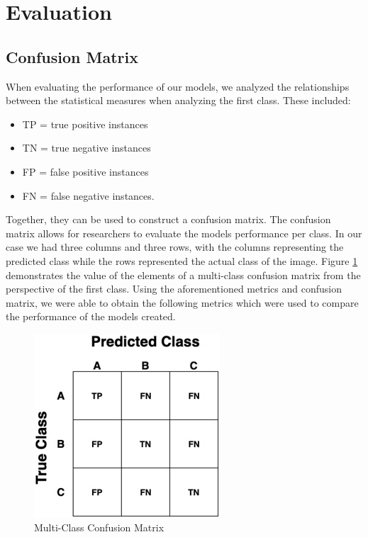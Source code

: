 \graphicspath{ {project_images/} }

\section{Evaluation}

\subsection{Confusion Matrix}
When evaluating the performance of our models, we analyzed the relationships between the statistical measures when analyzing the first class.
These included:

\begin{itemize}
    \item TP = true positive instances
    \item TN = true negative instances
    \item FP = false positive instances 
    \item FN = false negative instances.
\end{itemize}

Together, they can be used to construct a confusion matrix.
The confusion matrix allows for researchers to evaluate the models performance per class.
In our case we had three columns and three rows, with the columns representing the predicted class while the rows represented the actual class of the image.
Figure \ref{fig:figure6} demonstrates the value of the elements of a multi-class confusion matrix from the perspective of the first class.
Using the aforementioned metrics and confusion matrix, we were able to obtain the following metrics which were used to compare the performance of the models created.

\begin{figure}[h]
	\centering
	\includegraphics[scale=0.4]{multiclass_cfm}
	\caption{Multi-Class Confusion Matrix}
	\label{fig:figure6}
\end{figure}

